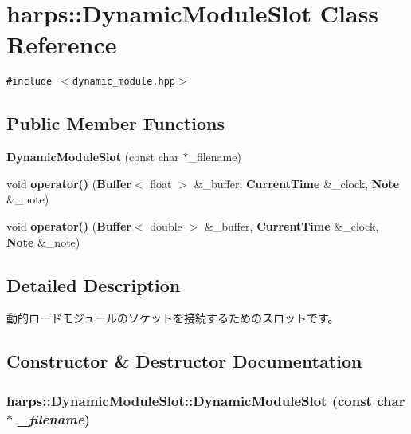 \section{harps::DynamicModuleSlot Class Reference}
\label{classharps_1_1DynamicModuleSlot}
{\tt \#include $<$dynamic\_\-module.hpp$>$}

\subsection*{Public Member Functions}
\begin{CompactItemize}
\item 
{\bf DynamicModuleSlot} (const char $\ast$\_\-filename)
\item 
void \textbf{operator()} ({\bf Buffer}$<$ float $>$ \&\_\-buffer, {\bf CurrentTime} \&\_\-clock, {\bf Note} \&\_\-note)\label{classharps_1_1DynamicModuleSlot_0bb30450af88f9a6bfe7b796d6533a05}

\item 
void \textbf{operator()} ({\bf Buffer}$<$ double $>$ \&\_\-buffer, {\bf CurrentTime} \&\_\-clock, {\bf Note} \&\_\-note)\label{classharps_1_1DynamicModuleSlot_d8a9c601e21e7daf79992b65e6babb36}

\end{CompactItemize}


\subsection{Detailed Description}
動的ロードモジュールのソケットを接続するためのスロットです。 

\subsection{Constructor \& Destructor Documentation}
\subsubsection[DynamicModuleSlot]{\setlength{\rightskip}{0pt plus 5cm}harps::DynamicModuleSlot::DynamicModuleSlot (const char $\ast$ {\em \_\-filename})\hspace{0.3cm}{\tt  [inline]}}\label{classharps_1_1DynamicModuleSlot_ae856e3f338981e6016c9834433bfeff}


